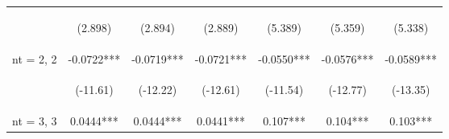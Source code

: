 \documentclass{standalone}
\begin{document}
\begin{tabular}{lcccccc}
    \vspace{4pt}     & \begin{footnotesize}(2.898)\end{footnotesize}   & \begin{footnotesize}(2.894)\end{footnotesize}   & \begin{footnotesize}(2.889)\end{footnotesize}   & \begin{footnotesize}(5.389)\end{footnotesize}  & \begin{footnotesize}(5.359)\end{footnotesize}  & \begin{footnotesize}(5.338)\end{footnotesize}  \\
    nt = 2, 2        & -0.0722***                                      & -0.0719***                                      & -0.0721***                                      & -0.0550***                                     & -0.0576***                                     & -0.0589***                                     \\
    \vspace{4pt}     & \begin{footnotesize}(-11.61)\end{footnotesize}  & \begin{footnotesize}(-12.22)\end{footnotesize}  & \begin{footnotesize}(-12.61)\end{footnotesize}  & \begin{footnotesize}(-11.54)\end{footnotesize} & \begin{footnotesize}(-12.77)\end{footnotesize} & \begin{footnotesize}(-13.35)\end{footnotesize} \\
    nt = 3, 3        & 0.0444***                                       & 0.0444***                                       & 0.0441***                                       & 0.107***                                       & 0.104***                                       & 0.103***                                       \\

\end{tabular}
\end{document}
